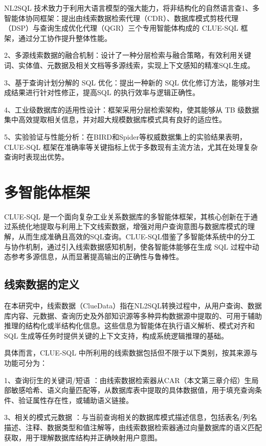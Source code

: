 \documentclass[12pt,a4paper,openright,UTF8]{ctexbook}
\begin{document}
NL2SQL 技术致力于利用大语言模型的强大能力，将非结构化的自然语言查1、多智能体协同框架：提出由线索数据检索代理（CDR）、数据库模式剪枝代理（DSP）与查询生成优化代理（QGR）三个专用智能体构成的 CLUE-SQL 框架，通过分工协作提升整体性能。


2、多源线索数据的融合机制：设计了一种分层检索与融合策略，有效利用关键词、实体值、元数据及相关文档等多源线索，实现上下文感知的精准SQL生成。


3、基于查询计划分解的 SQL 优化：提出一种新的 SQL 优化修订方法，能够对生成结果进行针对性修正，提高SQL 的执行效率与逻辑正确性。


4、工业级数据库的适用性设计：框架采用分层检索架构，使其能够从 TB 级数据集中高效提取相关信息，并对超大规模数据库模式具有良好的适应性。


5、实验验证与性能分析：在BIRD和Spider等权威数据集上的实验结果表明，CLUE-SQL 框架在准确率等关键指标上优于多数现有主流方法，尤其在处理复杂查询时表现出优势。

\section{多智能体框架}

CLUE-SQL 是一个面向复杂工业关系数据库的多智能体框架，其核心创新在于通过系统化地提取与利用上下文线索数据，增强对用户查询意图与数据库模式的理解，从而生成准确且高效的SQL查询。CLUE-SQL借鉴了多智能体系统中的分工与协作机制，通过引入线索数据感知机制，使各智能体能够在生成 SQL 过程中动态参考多源信息，从而显著提高输出的正确性与鲁棒性。

\subsection{线索数据的定义}

在本研究中，线索数据（ClueData）指在NL2SQL转换过程中，从用户查询、数据库内容、元数据、查询历史及外部知识源等多种异构数据源中提取的、可用于辅助推理的结构化或半结构化信息。这些信息为智能体在执行语义解析、模式对齐和SQL 生成等任务时提供关键的上下文支持，构成系统逻辑推理的基础。


具体而言，CLUE-SQL 中所利用的线索数据包括但不限于以下类别，按其来源与功能可分为：


1、查询衍生的关键词/短语 ：由线索数据检索器从CAR（本文第三章介绍）生局部敏感哈希、语义向量匹配等，从数据库表中提取的具体数据值，用于填充查询条件、验证属性存在性，或辅助语义链接。


3、相关的模式元数据 ：与当前查询相关的数据库模式描述信息，包括表名/列名描述、注释、数据类型和值注解等，由线索数据检索器通过向量数据库的语义匹配获取，用于理解数据库结构并正确映射用户意图。
\end{document}

